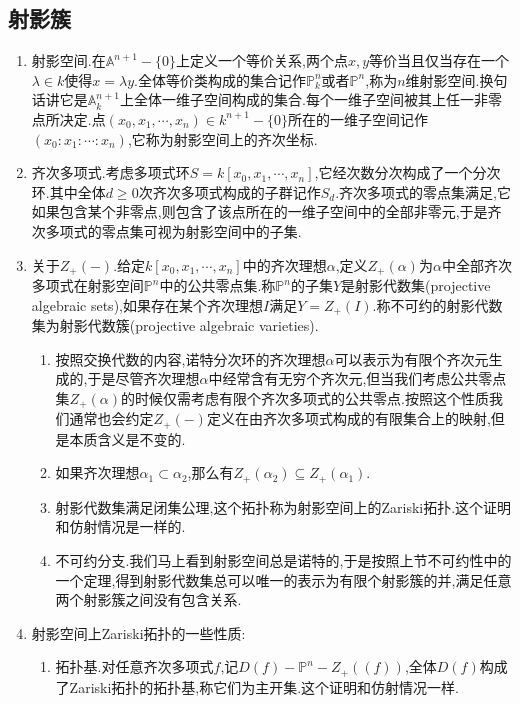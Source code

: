\subsection{射影簇}
\begin{enumerate}
	\item 射影空间.在$\mathbb{A}^{n+1}-\{0\}$上定义一个等价关系,两个点$x,y$等价当且仅当存在一个$\lambda\in k$使得$x=\lambda y$.全体等价类构成的集合记作$\mathbb{P}_k^n$或者$\mathbb{P}^n$,称为$n$维射影空间.换句话讲它是$\mathbb{A}_k^{n+1}$上全体一维子空间构成的集合.每个一维子空间被其上任一非零点所决定.点$(x_0,x_1,\cdots,x_n)\in k^{n+1}-\{0\}$所在的一维子空间记作$(x_0:x_1:\cdots:x_n)$,它称为射影空间上的齐次坐标.
	\item 齐次多项式.考虑多项式环$S=k[x_0,x_1,\cdots,x_n]$,它经次数分次构成了一个分次环.其中全体$d\ge0$次齐次多项式构成的子群记作$S_d$.齐次多项式的零点集满足,它如果包含某个非零点,则包含了该点所在的一维子空间中的全部非零元,于是齐次多项式的零点集可视为射影空间中的子集.
	\item 关于$Z_+(-)$.给定$k[x_0,x_1,\cdots,x_n]$中的齐次理想$\alpha$,定义$Z_+(\alpha)$为$\alpha$中全部齐次多项式在射影空间$\mathbb{P}^n$中的公共零点集.称$\mathbb{P}^n$的子集$Y$是射影代数集(projective algebraic sets),如果存在某个齐次理想$I$满足$Y=Z_+(I)$.称不可约的射影代数集为射影代数簇(projective algebraic varieties).
	\begin{enumerate}
		\item 按照交换代数的内容,诺特分次环的齐次理想$\alpha$可以表示为有限个齐次元生成的,于是尽管齐次理想$\alpha$中经常含有无穷个齐次元,但当我们考虑公共零点集$Z_+(\alpha)$的时候仅需考虑有限个齐次多项式的公共零点.按照这个性质我们通常也会约定$Z_+(-)$定义在由齐次多项式构成的有限集合上的映射,但是本质含义是不变的.
		\item 如果齐次理想$\alpha_1\subset\alpha_2$,那么有$Z_+(\alpha_2)\subseteq Z_+(\alpha_1)$.
		\item 射影代数集满足闭集公理,这个拓扑称为射影空间上的Zariski拓扑.这个证明和仿射情况是一样的.
		\item 不可约分支.我们马上看到射影空间总是诺特的,于是按照上节不可约性中的一个定理,得到射影代数集总可以唯一的表示为有限个射影簇的并,满足任意两个射影簇之间没有包含关系.
	\end{enumerate}
    \item 射影空间上Zariski拓扑的一些性质:
    \begin{enumerate}
    	\item 拓扑基.对任意齐次多项式$f$,记$D(f)-\mathbb{P}^n-Z_+((f))$,全体$D(f)$构成了Zariski拓扑的拓扑基,称它们为主开集.这个证明和仿射情况一样.

\end{enumerate}
\end{enumerate}
